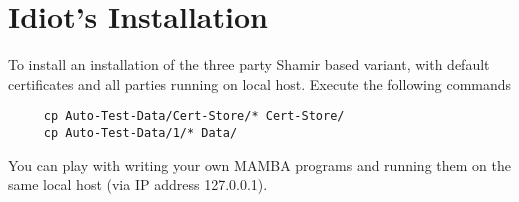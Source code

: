 \section{Idiot's Installation}
\label{sec:idiot}
To install an installation of the three party Shamir based
variant, with default certificates and all parties running
on local host. 
Execute the following commands
\begin{verbatim}
     cp Auto-Test-Data/Cert-Store/* Cert-Store/
     cp Auto-Test-Data/1/* Data/
\end{verbatim}
You can play with writing your own MAMBA programs and 
running them on the same local host (via IP address
127.0.0.1).
